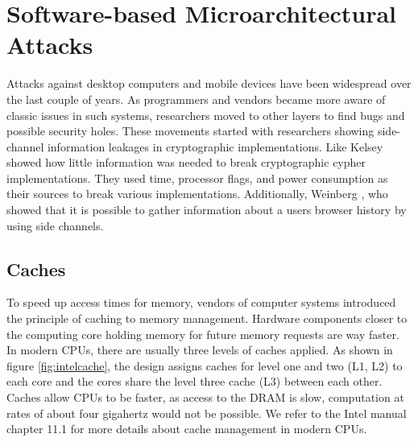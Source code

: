 
\section{Software-based Microarchitectural Attacks}

Attacks against desktop computers and mobile devices have been widespread over
the last couple of years. As programmers and vendors became more aware of
classic issues in such systems, researchers moved to other layers to find bugs
and possible security holes. These movements started with researchers showing
side-channel information leakages in cryptographic implementations. Like
Kelsey \etal\cite{kelsey1998side} showed how little information was needed
to break cryptographic cypher implementations. They used time, processor flags,
and power consumption as their sources to break various implementations.
Additionally, Weinberg \etal\cite{weinberg2011still}, who showed that it is
possible to gather information about a users browser history by using side
channels.

\subsection{Caches}

To speed up access times for memory, vendors of computer systems introduced the
principle of caching to memory management. Hardware components closer to the
computing core holding memory for future memory requests are way faster. In
modern CPUs, there are usually three levels of caches applied. As shown in
figure \ref{fig:intelcache}, the design assigns caches for level one and two
(L1, L2) to each core and the cores share the level three cache (L3) between
each other. Caches allow CPUs to be faster, as access to the DRAM is slow,
computation at rates of about four gigahertz would not be possible. We refer to
the Intel manual~\cite{intelsys} chapter 11.1 for more details about cache
management in modern CPUs.


